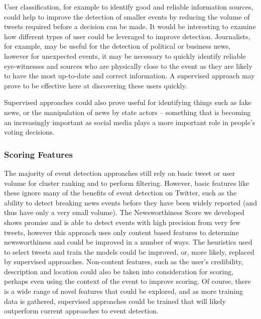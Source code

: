 User classification, for example to identify good and reliable information sources, could help to improve the detection of smaller events by reducing the volume of tweets required before a decision can be made.
It would be interesting to examine how different types of user could be leveraged to improve detection.
Journalists, for example, may be useful for the detection of political or business news, however for unexpected events, it may be necessary to quickly identify reliable eye-witnesses and sources who are physically close to the event as they are likely to have the most up-to-date and correct information.
A supervised approach may prove to be effective here at discovering these users quickly.

Supervised approaches could also prove useful for identifying things such as fake news, or the manipulation of news by state actors -- something that is becoming an increasingly important as social media plays a more important role in people's voting decisions.


\subsubsection{Scoring Features}
The majority of event detection approaches still rely on basic tweet or user volume for cluster ranking and to perform filtering.
However, basic features like these ignore many of the benefits of event detection on Twitter, such as the ability to detect breaking news events before they have been widely reported (and thus have only a very small volume).
The Newsworthiness Score we developed shows promise and is able to detect events with high precision from very few tweets, however this approach uses only content based features to determine newsworthiness and could be improved in a number of ways.
The heuristics used to select tweets and train the models could be improved, or, more likely, replaced by supervised approaches.
Non-content features, such as the user's credibility, description and location could also be taken into consideration for scoring, perhaps even using the context of the event to improve scoring.
Of course, there is a wide range of novel features that could be explored, and as more training data is gathered, supervised approaches could be trained that will likely outperform current approaches to event detection.


